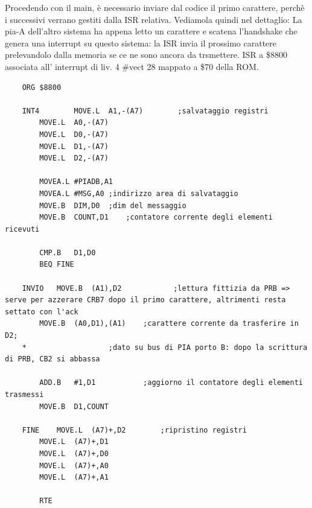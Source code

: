 Procedendo con il main, è necessario inviare dal codice il primo carattere, perchè i successivi verrano gestiti dalla ISR relativa. 
Vediamola quindi nel dettaglio: La pia-A dell'altro sistema ha appena letto un carattere e scatena l'handshake che genera una interrupt
su questo sistema: la ISR invia il prossimo carattere prelevandolo dalla memoria se ce ne sono ancora da trsmettere.
ISR a \$8800 associata all' interrupt di liv. 4  \#vect 28  mappato a \$70 della ROM.

\begin{lstlisting}
    ORG $8800		

    INT4    	MOVE.L	A1,-(A7)		;salvataggio registri
        MOVE.L	A0,-(A7)
        MOVE.L	D0,-(A7)
        MOVE.L	D1,-(A7)
        MOVE.L	D2,-(A7)
    
        MOVEA.L	#PIADB,A1
        MOVEA.L	#MSG,A0	;indirizzo area di salvataggio
        MOVE.B	DIM,D0	;dim del messaggio
        MOVE.B	COUNT,D1	;contatore corrente degli elementi ricevuti
    
        CMP.B	D1,D0
        BEQ	FINE
        
    INVIO	MOVE.B	(A1),D2            ;lettura fittizia da PRB => serve per azzerare CRB7 dopo il primo carattere, altrimenti resta settato con l'ack
        MOVE.B	(A0,D1),(A1)	;carattere corrente da trasferire in D2;
    *					;dato su bus di PIA porto B: dopo la scrittura di PRB, CB2 si abbassa
                    
        ADD.B	#1,D1			;aggiorno il contatore degli elementi trasmessi
        MOVE.B	D1,COUNT
    
    FINE	MOVE.L  (A7)+,D2		;ripristino registri 
        MOVE.L  (A7)+,D1
        MOVE.L  (A7)+,D0	
        MOVE.L  (A7)+,A0
        MOVE.L  (A7)+,A1
        
        RTE
\end{lstlisting}

